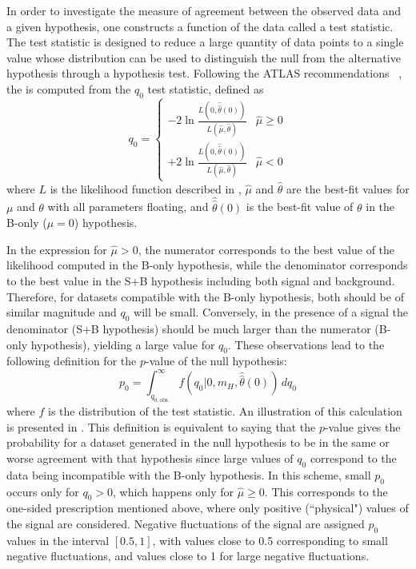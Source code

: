 In order to investigate the measure of agreement between the observed data
and a given hypothesis, one constructs a function of the data
called a test statistic. The test statistic is designed to reduce a large
quantity of data points to a single value whose distribution can be used to
distinguish the null from the alternative hypothesis through a 
hypothesis test. Following the ATLAS recommendations~\cite{ATLAS_stat_recommendations}
, the \pzero is computed from the $q_0$ test statistic, defined as
\[
    q_0 =
    \begin{cases}
        -2\ln{\frac{L(0,\hat{\hat\theta}(0))}{L(\hat\mu,\hat\theta)}} & \hat\mu \ge 0 \\
        +2\ln{\frac{L(0,\hat{\hat\theta}(0))}{L(\hat\mu,\hat\theta)}} & \hat\mu < 0
    \end{cases}
\]
where $L$ is the likelihood function described in ,
$\hat \mu$ and $\hat \theta$ are the best-fit values for $\mu$ and $\theta$
with all parameters floating, and $\hat{\hat\theta}(0)$ is the best-fit value of
$\theta$ in the B-only ($\mu=0$) hypothesis. 

In the expression for $\hat\mu > 0$, 
the numerator corresponds to the best value of the likelihood computed in the
B-only hypothesis, while the denominator corresponds to the best value in the
S+B hypothesis including both signal and background. Therefore, for datasets 
compatible with the B-only hypothesis, both should be of similar magnitude and
$q_0$ will be small. Conversely, in the presence of a signal the denominator
(S+B hypothesis) should be much larger than the numerator (B-only hypothesis),
yielding a large value for $q_0$. These observations lead to the following
definition for the $p$-value of the null hypothesis:
\[
    p_0 = \int_{q_{0,\text{obs.}}}^{\infty} f(q_0|0,m_H,\hat{\hat\theta}(0))\,dq_0
\]
where $f$ is the distribution of the test statistic. An illustration of this 
calculation is presented in . This definition is equivalent
to saying that the $p$-value gives the probability for a dataset generated in the
null hypothesis to be in the same or worse agreement with that hypothesis since
large values of $q_0$ correspond to the data being incompatible with the B-only
hypothesis. In this scheme, small $p_0$ occurs only for $q_0 > 0$, which happens
only for $\hat\mu \ge 0$. This corresponds to the one-sided prescription mentioned
above, where only positive (``physical") values of the signal are considered. 
Negative fluctuations of the  signal are assigned $p_0$ values in the interval
$[0.5,1]$, with values close to 0.5 corresponding to small negative fluctuations,
and values close to 1 for large negative fluctuations.

